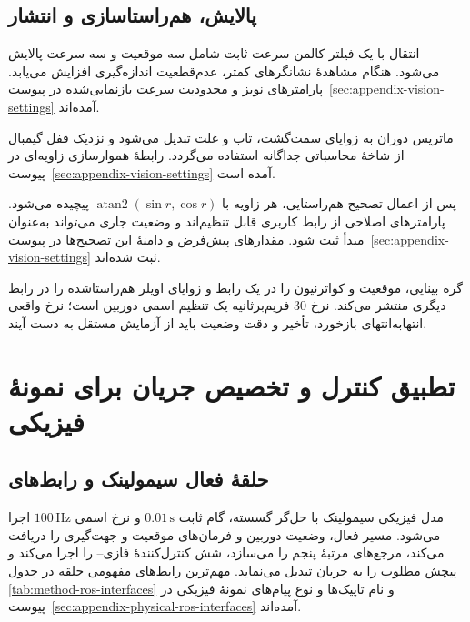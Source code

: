 \subsection{پالایش، هم‌راستاسازی و انتشار}

انتقال با یک فیلتر کالمن سرعت ثابت شامل سه موقعیت و سه سرعت پالایش می‌شود. هنگام مشاهدهٔ نشانگرهای کمتر، عدم‌قطعیت اندازه‌گیری افزایش می‌یابد. پارامترهای نویز و محدودیت سرعت بازنمایی‌شده در پیوست~\ref{sec:appendix-vision-settings} آمده‌اند.

ماتریس دوران به زوایای سمت‌گشت، تاب و غلت تبدیل می‌شود و نزدیک قفل گیمبال از شاخهٔ محاسباتی جداگانه استفاده می‌گردد. رابطهٔ هموارسازی زاویه‌ای در پیوست~\ref{sec:appendix-vision-settings} آمده است.

پس از اعمال تصحیح هم‌راستایی، هر زاویه با $\operatorname{atan2}(\sin r,\cos r)$ پیچیده می‌شود. پارامترهای اصلاحی از رابط کاربری قابل تنظیم‌اند و وضعیت جاری می‌تواند به‌عنوان مبدأ ثبت شود. مقدارهای پیش‌فرض و دامنهٔ این تصحیح‌ها در پیوست~\ref{sec:appendix-vision-settings} ثبت شده‌اند.

گره بینایی، موقعیت و کواترنیون را در یک رابط و زوایای اویلر هم‌راستاشده را در رابط دیگری منتشر می‌کند. نرخ 30 فریم‌برثانیه یک تنظیم اسمی دوربین است؛ نرخ واقعی انتهابه‌انتهای بازخورد، تأخیر و دقت وضعیت باید از آزمایش مستقل به دست آیند.

\section{تطبیق کنترل و تخصیص جریان برای نمونهٔ فیزیکی}
\label{sec:method-physical-control}

\subsection{حلقهٔ فعال سیمولینک و رابط‌های }

مدل فیزیکی سیمولینک با حل‌گر گسسته، گام ثابت $0.01\,\mathrm s$ و نرخ اسمی $100\,\mathrm{Hz}$ اجرا می‌شود. مسیر فعال، وضعیت دوربین و فرمان‌های موقعیت و جهت‌گیری را دریافت می‌کند، مرجع‌های مرتبهٔ پنجم را می‌سازد، شش کنترل‌کنندهٔ فازی-- را اجرا می‌کند و پیچش مطلوب را به جریان تبدیل می‌نماید. مهم‌ترین رابط‌های مفهومی حلقه در جدول \ref{tab:method-ros-interfaces} و نام تاپیک‌ها و نوع پیام‌های نمونهٔ فیزیکی در پیوست~\ref{sec:appendix-physical-ros-interfaces} آمده‌اند.

